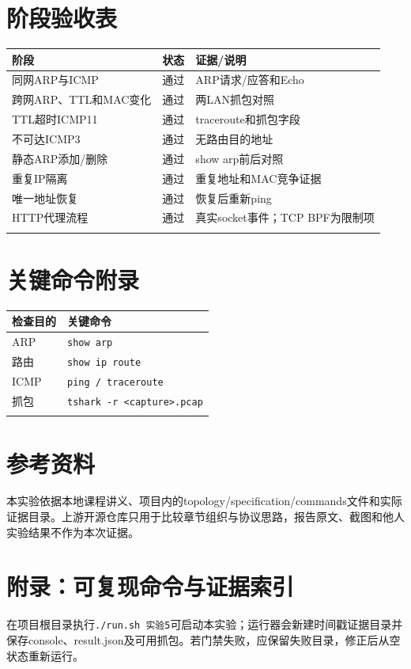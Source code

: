 \documentclass[UTF8,a4paper,12pt]{ctexart}
\begin{document}
\section{阶段验收表}
\begin{longtable}{p{}p{}p{}}\toprule 阶段 & 状态 & 证据/说明\\\midrule
同网ARP与ICMP & 通过 & ARP请求/应答和Echo\\
跨网ARP、TTL和MAC变化 & 通过 & 两LAN抓包对照\\
TTL超时ICMP11 & 通过 & traceroute和抓包字段\\
不可达ICMP3 & 通过 & 无路由目的地址\\
静态ARP添加/删除 & 通过 & show arp前后对照\\
重复IP隔离 & 通过 & 重复地址和MAC竞争证据\\
唯一地址恢复 & 通过 & 恢复后重新ping\\
HTTP代理流程 & 通过 & 真实socket事件；TCP BPF为限制项\\\\\bottomrule\end{longtable}
\section{关键命令附录}
\begin{longtable}{p{}p{}}\toprule 检查目的 & 关键命令\\\midrule
ARP & \texttt{show arp}\\
路由 & \texttt{show ip route}\\
ICMP & \texttt{ping / traceroute}\\
抓包 & \texttt{tshark -r <capture>.pcap}\\\\\bottomrule\end{longtable}
\section{参考资料}
本实验依据本地课程讲义、项目内的topology/specification/commands文件和实际证据目录。上游开源仓库只用于比较章节组织与协议思路，报告原文、截图和他人实验结果不作为本次证据。
\section{附录：可复现命令与证据索引}
在项目根目录执行\texttt{./run.sh 实验5}可启动本实验；运行器会新建时间戳证据目录并保存console、result.json及可用抓包。若门禁失败，应保留失败目录，修正后从空状态重新运行。
\end{document}
